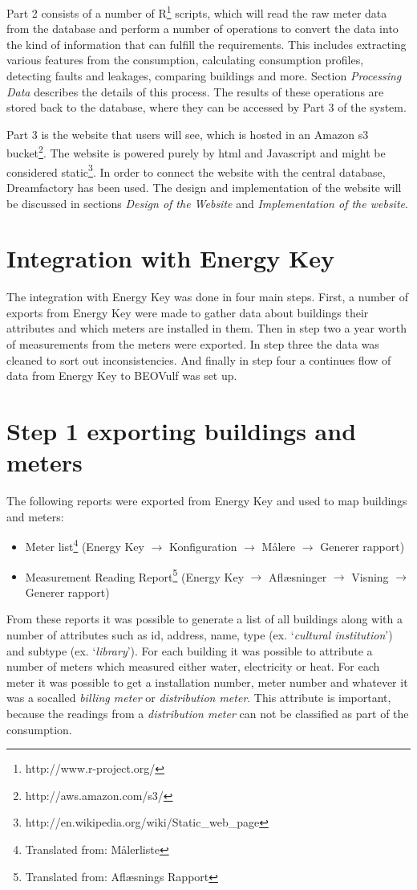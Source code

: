 Part 2 consists of a number of R\footnote{http://www.r-project.org/} scripts, which will read the raw meter data from the database and perform a number of operations to convert the data into the kind of information that can fulfill the requirements. This includes extracting various features from the consumption, calculating consumption profiles, detecting faults and leakages, comparing buildings and more. Section \emph{Processing Data} describes the details of this process. The results of these operations are stored back to the database, where they can be accessed by Part 3 of the system.

Part 3 is the website that users will see, which is hosted in an Amazon s3 bucket\footnote{http://aws.amazon.com/s3/}. The website is powered purely by html and Javascript and might be considered static\footnote{http://en.wikipedia.org/wiki/Static\_web\_page}. In order to connect the website with the central database, Dreamfactory has been used. The design and implementation of the website will be discussed in sections \emph{Design of the Website} and \emph{Implementation of the website}.
\section{Integration with Energy Key}
The integration with Energy Key was done in four main steps. First, a number of exports from Energy Key were made to gather data about buildings their attributes and which meters are installed in them. Then in step two a year worth of measurements from the meters were exported. In step three the data was cleaned to sort out inconsistencies. And finally in step four a continues flow of data from Energy Key to BEOVulf was set up.
\section*{Step 1 exporting buildings and meters}
The following reports were exported from Energy Key and used to map buildings and meters:
\begin{itemize}
\item Meter list\footnote{Translated from: Målerliste}  (Energy Key $\rightarrow$ Konfiguration $\rightarrow$ Målere $\rightarrow$ Generer rapport)
\item Measurement Reading Report\footnote{Translated from: Aflæsnings Rapport} (Energy Key $\rightarrow$ Aflæsninger $\rightarrow$ Visning $\rightarrow$ Generer rapport)
\end{itemize}
From these reports it was possible to generate a list of all buildings along with a number of attributes such as id, address, name, type (ex. ‘\emph{cultural institution}’) and subtype (ex. ‘\emph{library}’). For each building it was possible to attribute a number of meters which measured either water, electricity or heat. For each meter it was possible to get a installation number, meter number and whatever it was a socalled \emph{billing meter} or \emph{distribution meter}. This attribute is important, because the readings from a \emph{distribution meter} can not be classified as part of the consumption.
